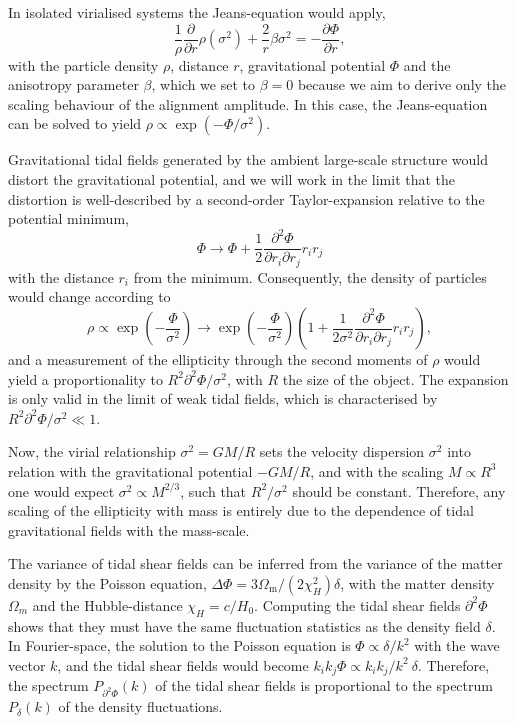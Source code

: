 \documentclass[a4paper,fleqn,usenatbib]{mnras}
\begin{document}
In isolated virialised systems the Jeans-equation would apply,
\begin{equation}
\frac{1}{\rho}\frac{\partial}{\partial r}\rho(\sigma^2) + \frac{2}{r}\beta\sigma^2 = 
-\frac{\partial\Phi}{\partial r},
\end{equation}
with the particle density $\rho$, distance $r$, gravitational potential $\Phi$ and the anisotropy parameter $\beta$, which we set to $\beta=0$ because we aim to derive only the scaling behaviour of the alignment amplitude. In this case, the Jeans-equation can be solved to yield $\rho\propto\exp(-\Phi/\sigma^2)$.

Gravitational tidal fields generated by the ambient large-scale structure would distort the gravitational potential, and we will work in the limit that the distortion is well-described by a second-order Taylor-expansion relative to the potential minimum,
\begin{equation}
\Phi\rightarrow\Phi+\frac{1}{2}\frac{\partial^2\Phi}{\partial r_i\partial r_j}r_ir_j
\end{equation}
with the distance $r_i$ from the minimum. Consequently, the density of particles would change according to
\begin{equation}
\rho\propto\exp\left(-\frac{\Phi}{\sigma^2}\right) \rightarrow 
\exp\left(-\frac{\Phi}{\sigma^2}\right)\left(1+\frac{1}{2\sigma^2}\frac{\partial^2\Phi}{\partial r_i\partial r_j}r_ir_j\right),
\end{equation}
and a measurement of the ellipticity through the second moments of $\rho$ would yield a proportionality to $R^2\partial^2\Phi/\sigma^2$, with $R$ the size of the object. The expansion is only valid in the limit of weak tidal fields, which is characterised by $R^2\partial^2\Phi/\sigma^2\ll 1$.

Now, the virial relationship $\sigma^2 = GM/R$ sets the velocity dispersion $\sigma^2$ into relation with the gravitational potential $-GM/R$, and with the scaling $M\propto R^3$ one would expect $\sigma^2\propto M^{2/3}$, such that $R^2/\sigma^2$ should be constant. Therefore, any scaling of the ellipticity with mass is entirely due to the dependence of tidal gravitational fields with the mass-scale.

The variance of tidal shear fields can be inferred from the variance of the matter density by the Poisson equation, $\Delta\Phi = 3\Omega_\mathrm{m}/(2\chi_H^2)\delta$, with the matter density $\Omega_m$ and the Hubble-distance $\chi_H=c/H_0$. Computing the tidal shear fields $\partial^2\Phi$ shows that they must have the same fluctuation statistics as the density field $\delta$. In Fourier-space, the solution to the Poisson equation is $\Phi \propto \delta/k^2$ with the wave vector $k$, and the tidal shear fields would become $k_ik_j\Phi \propto k_ik_j/k^2\:\delta$. Therefore, the spectrum $P_{\partial^2\Phi}(k)$ of the tidal shear fields is proportional to the spectrum $P_\delta(k)$ of the density fluctuations.
\end{document}
